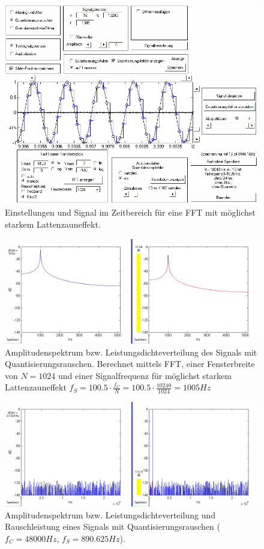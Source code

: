 \begin{figure}[h!]
\centering
\includegraphics[width=\columnwidth]{figures/Aufg1/2_2_fenster_schlecht_einstell.JPG} 
\caption{Einstellungen und Signal im Zeitbereich für eine FFT mit möglichst starkem Lattenzauneffekt.}
\end{figure}

\begin{figure}[h!]
\centering
\includegraphics[width=\columnwidth]{figures/Aufg1/2_2_fenster_schlecht.JPG} 
\caption{Amplitudenspektrum bzw. Leistungsdichteverteilung des Signals mit Quantisierungsrauschen. Berechnet mittels FFT, einer Fensterbreite von $N = 1024$ und einer Signalfrequenz für möglichst starkem Lattenzauneffekt $f_S = 100.5 \cdot \frac{f_C}{N} = 100.5 \cdot \frac{10240}{1024} = 1005Hz$}
\label{fig:lattenzaun}
\end{figure}

\begin{figure}[h!]
\centering
\includegraphics[width=\columnwidth]{figures/Aufg1/2_3_890hz.JPG} 
\caption{Amplitudenspektrum bzw. Leistungsdichteverteilung und Rauschleistung eines Signals mit Quantisierungsrauschen ($f_C = 48000Hz$, $f_S = 890.625Hz$).}
\label{fig:terz}
\end{figure}

